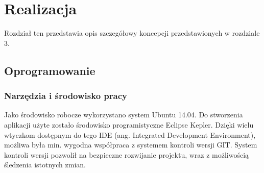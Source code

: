 
\chapter{Realizacja} %
Rozdział ten przedstawia opis szczegółowy koncepcji przedstawionych w rozdziale 3.
\section{Oprogramowanie}
\subsection{Narzędzia i środowisko pracy}
Jako środowisko robocze wykorzystano system Ubuntu 14.04. Do stworzenia aplikacji użyte zostało środowisko programistyczne Eclipse Kepler. Dzięki wielu wtyczkom dostępnym do tego IDE (ang. Integrated Development Environment), możliwa była min. wygodna współpraca z systemem kontroli wersji GIT. System kontroli wersji pozwolił na bezpieczne rozwijanie projektu, wraz z możliwością śledzenia istotnych zmian.

